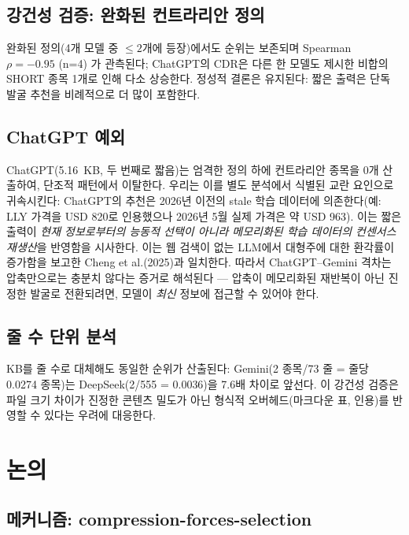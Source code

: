 \documentclass[11pt,letterpaper]{article}
\begin{document}
\subsection{강건성 검증: 완화된 컨트라리안 정의}\label{sec:robustness}

완화된 정의(4개 모델 중 $\leq 2$개에 등장)에서도 순위는 보존되며 Spearman $\rho=-0.95$ (n=4) 가 관측된다; ChatGPT의 CDR은 다른 한 모델도 제시한 비합의 SHORT 종목 1개로 인해 다소 상승한다. 정성적 결론은 유지된다: 짧은 출력은 단독 발굴 추천을 비례적으로 더 많이 포함한다.

\subsection{ChatGPT 예외}\label{sec:chatgpt}

ChatGPT(5.16~KB, 두 번째로 짧음)는 엄격한 정의 하에 컨트라리안 종목을 0개 산출하여, 단조적 패턴에서 이탈한다. 우리는 이를 별도 분석에서 식별된 교란 요인으로 귀속시킨다: ChatGPT의 추천은 2026년 이전의 stale 학습 데이터에 의존한다(예: LLY 가격을 USD 820로 인용했으나 2026년 5월 실제 가격은 약 USD 963). 이는 짧은 출력이 \textit{현재 정보로부터의 능동적 선택이 아니라 메모리화된 학습 데이터의 컨센서스 재생산}을 반영함을 시사한다. 이는 웹 검색이 없는 LLM에서 대형주에 대한 환각률이 증가함을 보고한 Cheng et al.(2025)과 일치한다. 따라서 ChatGPT--Gemini 격차는 압축만으로는 충분치 않다는 증거로 해석된다 --- 압축이 메모리화된 재반복이 아닌 진정한 발굴로 전환되려면, 모델이 \textit{최신} 정보에 접근할 수 있어야 한다.

\subsection{줄 수 단위 분석}

KB를 줄 수로 대체해도 동일한 순위가 산출된다: Gemini(2 종목/73 줄 = 줄당 0.0274 종목)는 DeepSeek(2/555 = 0.0036)을 7.6배 차이로 앞선다. 이 강건성 검증은 파일 크기 차이가 진정한 콘텐츠 밀도가 아닌 형식적 오버헤드(마크다운 표, 인용)를 반영할 수 있다는 우려에 대응한다.

\section{논의}\label{sec:discussion}

\subsection{메커니즘: compression-forces-selection}
\end{document}
